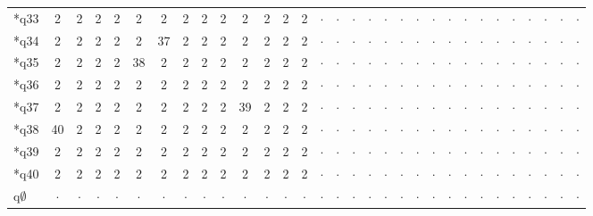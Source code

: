 \begin{longtable}{l|cccccccccccccccccccccccccccccc}
*q33 & 2 & 2 & 2 & 2 & 2 & 2 & 2 & 2 & 2 & 2 & 2 & 2 & 2 & $\cdot$ & $\cdot$ & $\cdot$ & $\cdot$ & $\cdot$ & $\cdot$ & $\cdot$ & $\cdot$ & $\cdot$ & $\cdot$ & $\cdot$ & $\cdot$ & $\cdot$ & $\cdot$ & $\cdot$ & $\cdot$ & $\cdot$ \\
*q34 & 2 & 2 & 2 & 2 & 2 & 37 & 2 & 2 & 2 & 2 & 2 & 2 & 2 & $\cdot$ & $\cdot$ & $\cdot$ & $\cdot$ & $\cdot$ & $\cdot$ & $\cdot$ & $\cdot$ & $\cdot$ & $\cdot$ & $\cdot$ & $\cdot$ & $\cdot$ & $\cdot$ & $\cdot$ & $\cdot$ & $\cdot$ \\
*q35 & 2 & 2 & 2 & 2 & 38 & 2 & 2 & 2 & 2 & 2 & 2 & 2 & 2 & $\cdot$ & $\cdot$ & $\cdot$ & $\cdot$ & $\cdot$ & $\cdot$ & $\cdot$ & $\cdot$ & $\cdot$ & $\cdot$ & $\cdot$ & $\cdot$ & $\cdot$ & $\cdot$ & $\cdot$ & $\cdot$ & $\cdot$ \\
*q36 & 2 & 2 & 2 & 2 & 2 & 2 & 2 & 2 & 2 & 2 & 2 & 2 & 2 & $\cdot$ & $\cdot$ & $\cdot$ & $\cdot$ & $\cdot$ & $\cdot$ & $\cdot$ & $\cdot$ & $\cdot$ & $\cdot$ & $\cdot$ & $\cdot$ & $\cdot$ & $\cdot$ & $\cdot$ & $\cdot$ & $\cdot$ \\
*q37 & 2 & 2 & 2 & 2 & 2 & 2 & 2 & 2 & 2 & 39 & 2 & 2 & 2 & $\cdot$ & $\cdot$ & $\cdot$ & $\cdot$ & $\cdot$ & $\cdot$ & $\cdot$ & $\cdot$ & $\cdot$ & $\cdot$ & $\cdot$ & $\cdot$ & $\cdot$ & $\cdot$ & $\cdot$ & $\cdot$ & $\cdot$ \\
*q38 & 40 & 2 & 2 & 2 & 2 & 2 & 2 & 2 & 2 & 2 & 2 & 2 & 2 & $\cdot$ & $\cdot$ & $\cdot$ & $\cdot$ & $\cdot$ & $\cdot$ & $\cdot$ & $\cdot$ & $\cdot$ & $\cdot$ & $\cdot$ & $\cdot$ & $\cdot$ & $\cdot$ & $\cdot$ & $\cdot$ & $\cdot$ \\
*q39 & 2 & 2 & 2 & 2 & 2 & 2 & 2 & 2 & 2 & 2 & 2 & 2 & 2 & $\cdot$ & $\cdot$ & $\cdot$ & $\cdot$ & $\cdot$ & $\cdot$ & $\cdot$ & $\cdot$ & $\cdot$ & $\cdot$ & $\cdot$ & $\cdot$ & $\cdot$ & $\cdot$ & $\cdot$ & $\cdot$ & $\cdot$ \\
*q40 & 2 & 2 & 2 & 2 & 2 & 2 & 2 & 2 & 2 & 2 & 2 & 2 & 2 & $\cdot$ & $\cdot$ & $\cdot$ & $\cdot$ & $\cdot$ & $\cdot$ & $\cdot$ & $\cdot$ & $\cdot$ & $\cdot$ & $\cdot$ & $\cdot$ & $\cdot$ & $\cdot$ & $\cdot$ & $\cdot$ & $\cdot$ \\
q$\emptyset$ & $\cdot$ & $\cdot$ & $\cdot$ & $\cdot$ & $\cdot$ & $\cdot$ & $\cdot$ & $\cdot$ & $\cdot$ & $\cdot$ & $\cdot$ & $\cdot$ & $\cdot$ & $\cdot$ & $\cdot$ & $\cdot$ & $\cdot$ & $\cdot$ & $\cdot$ & $\cdot$ & $\cdot$ & $\cdot$ & $\cdot$ & $\cdot$ & $\cdot$ & $\cdot$ & $\cdot$ & $\cdot$ & $\cdot$ & $\cdot$ \\
\end{longtable}
